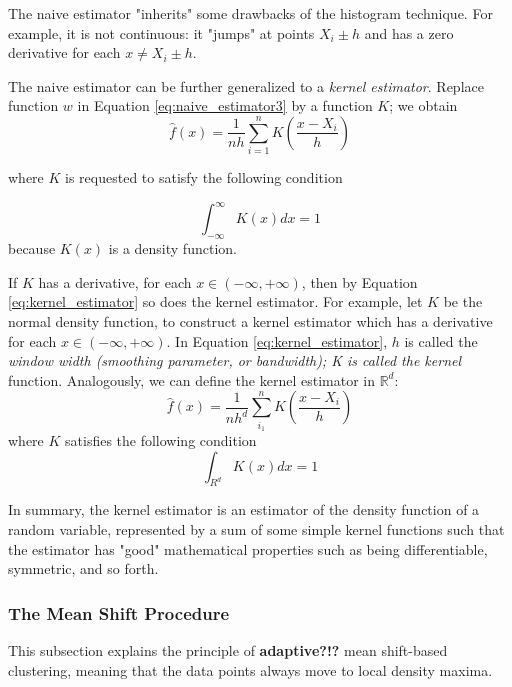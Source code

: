The naive estimator "inherits" some drawbacks of the histogram technique.
For example, it is not continuous: it "jumps" at points $X_i \pm h$ and has a 
zero derivative for each $x \neq X_i \pm h$.

The naive estimator can be further generalized to a \emph{kernel estimator}. 
Replace function $w$ in Equation \eqref{eq:naive_estimator3} by a function $K$;
we obtain
\begin{equation}\label{eq:kernel_estimator}
	\hat{f}(x) = \frac{1}{nh} \sum_{i=1}^n K\left( \frac{x - X_i}{h} \right)
\end{equation}

where $K$ is requested to satisfy the following condition

\begin{equation}\label{eq:kernel_condition}
	\int_{-\infty}^{\infty} K(x)dx = 1
\end{equation}
because $K(x)$ is a density function.

If $K$ has a derivative, for each $x \in (-\infty, +\infty)$, then by Equation
\eqref{eq:kernel_estimator} so does the kernel estimator. For example, let $K$
be the normal density function, to construct a kernel estimator which has a 
derivative for each $x \in (-\infty, +\infty)$. In Equation \eqref{eq:kernel_estimator}, $h$ is called the \emph{window width (smoothing parameter, or bandwidth); K is called the kernel} function. 
Analogously, we can define the kernel estimator in $\mathbb{R}^d$:
\begin{equation}\label{eq:kernel_estimator_rd}
	\hat{f}(x) = \frac{1}{nh^d} \sum_{i_1}^n K\left( \frac{x-X_i}{h} \right)
\end{equation} 
where $K$ satisfies the following condition
\begin{equation}\label{eq:kernel_rd_condition}
	\int_{R^d} K(x)dx = 1
\end{equation}

In summary, the kernel estimator is an estimator of the density function of a 
random variable, represented by a sum of some simple kernel functions such that
the estimator has "good" mathematical properties such as being differentiable,
symmetric, and so forth.



\subsubsection{The Mean Shift Procedure} %
\label{ssub:the_mean_shift_procedure}
This subsection explains the principle of \textbf{adaptive?!?} mean shift-based
clustering, meaning that the data points always move to local density maxima.

